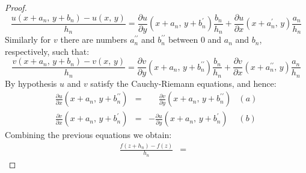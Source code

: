 \documentclass{article}
\theoremstyle{definition}
\begin{document}
\begin{proof}
\begin{equation}
                \label{eqn:u_mvt}
                \frac{u(x+a_{n},\,y+b_{n})-u(x,\,y)}{h_{n}}
                =\frac{\partial{u}}{\partial{y}}
                \left(x+a_{n},\,y+b_{n}^{\prime}\right)\frac{b_{n}}{h_{n}}
                +\frac{\partial{u}}{\partial{x}}
                \left(x+a_{n}^{\prime},\,y\right)\frac{a_{n}}{h_{n}}
            \end{equation}
            Similarly for $v$ there are numbers $a_{n}^{\prime\prime}$ and
            $b_{n}^{\prime\prime}$ between $0$ and $a_{n}$ and $b_{n}$,
            respectively, such that:
            \begin{equation}
                \label{eqn:v_mvt}
                \frac{v(x+a_{n},\,y+b_{n})-v(x,\,y)}{h_{n}}
                =\frac{\partial{v}}{\partial{y}}
                \left(x+a_{n},\,y+b_{n}^{\prime\prime}\right)
                \frac{b_{n}}{h_{n}}
                +\frac{\partial{v}}{\partial{x}}
                \left(x+a_{n}^{\prime\prime},\,y\right)
                \frac{a_{n}}{h_{n}}
            \end{equation}
            By hypothesis $u$ and $v$ satisfy the Cauchy-Riemann equations,
            and hence:
            \begin{equation}
                \label{eqn:cauchy_riemann_with_mvt}
                \begin{array}{rclr}
                    \displaystyle
                    \frac{\partial{u}}{\partial{x}}
                    \left(x+a_{n},\,y+b_{n}^{\prime\prime}\right)
                    &=&
                    \displaystyle
                    \phantom{+}
                    \frac{\partial{v}}{\partial{y}}
                    \left(x+a_{n},\,y+b_{n}^{\prime\prime}\right)
                    &(a)\\[1.5em]
                    \displaystyle
                    \frac{\partial{v}}{\partial{x}}
                    \left(x+a_{n},\,y+b_{n}^{\prime}\right)
                    &=&
                    \displaystyle
                    -\frac{\partial{u}}{\partial{y}}
                    \left(x+a_{n},\,y+b_{n}^{\prime}\right)
                    &(b)
                \end{array}
            \end{equation}
            Combining the previous equations we obtain:
            \begin{equation}
                \begin{array}{rcll}
                    \displaystyle
                    \frac{f(z+h_{n})-f(z)}{h_{n}}
                    &=&

\end{array}
\end{equation}
\end{proof}
\end{document}
